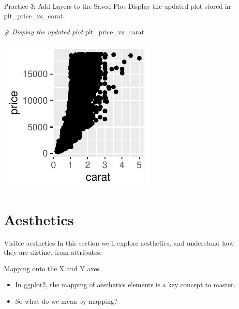 \documentclass[
  ignorenonframetext,
]{beamer}
\newenvironment{Shaded}{\begin{snugshade}}{\end{snugshade}}
\newcommand{\CommentTok}[1]{\textcolor[rgb]{0.56,0.35,0.01}{\textit{#1}}}
\newcommand{\NormalTok}[1]{#1}
\begin{document}
\begin{frame}[fragile]{Practice 3: Add Layers to the Saved Plot}
\label{practice-3-add-layers-to-the-saved-plot-1}
Display the updated plot stored in plt\_price\_vs\_carat.


\begin{Shaded}
\begin{Highlighting}[]
\CommentTok{\# Display the updated plot}
\NormalTok{plt\_price\_vs\_carat}
\end{Highlighting}
\end{Shaded}

\begin{center}\includegraphics[width=0.5\linewidth]{Figs/unnamed-chunk-9-1} \end{center}
\end{frame}

\section{Aesthetics}\label{aesthetics-2}

\begin{frame}{Visible aesthetics}
\label{visible-aesthetics}
In this section we'll explore aesthetics, and understand how they are
distinct from attributes.
\end{frame}

\begin{frame}{Mapping onto the X and Y axes}
\label{mapping-onto-the-x-and-y-axes}
\begin{itemize}
\item
  In ggplot2, the mapping of aesthetics elements is a key concept to
  master.
\item
  So what do we mean by mapping?
\end{itemize}
\end{frame}
\end{document}
